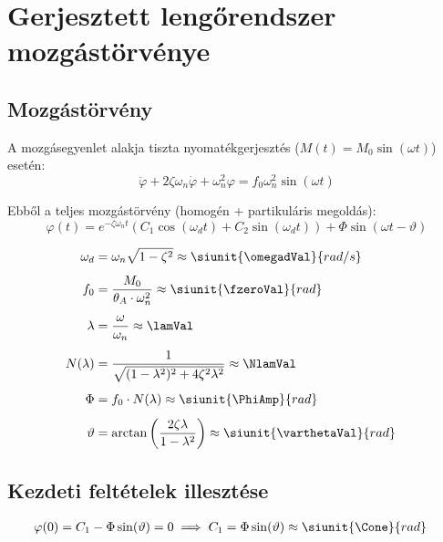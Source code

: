 \section{Gerjesztett lengőrendszer mozgástörvénye}

\subsection{Mozgástörvény}
A mozgásegyenlet alakja tiszta nyomatékgerjesztés ($M(t) = M_0 \sin(\omega t)$) esetén:
\begin{equation}
    \ddot{\varphi} + 2\zeta\omega_n\dot{\varphi} + \omega_n^2\varphi = f_0\omega_n^2 \sin(\omega t)
\end{equation}

Ebből a teljes mozgástörvény (homogén + partikuláris megoldás):
\begin{equation}
    \varphi(t) = e^{-\zeta\omega_n t} \left( C_1 \cos(\omega_d t) + C_2 \sin(\omega_d t) \right) + \Phi \sin(\omega t - \vartheta)
\end{equation}

\begin{align}
    \omega_d   & = \omega_n \sqrt{1 - \zeta^2} \approx \siunit{\omegadVal}{rad/s}                                 \\[1ex]
    f_0        & = \frac{M_0}{\theta_A \cdot \omega_n^2} \approx \siunit{\fzeroVal}{rad}                          \\[1ex]
    \lambda    & = \frac{\omega}{\omega_n} \approx \lamVal                                                        \\[1ex]
    N(\lambda) & = \frac{1}{\sqrt{(1-\lambda^2)^2 + 4\zeta^2\lambda^2}} \approx \NlamVal                          \\[1ex]
    \Phi       & = f_0 \cdot N(\lambda) \approx \siunit{\PhiAmp}{rad}                                             \\[1ex]
    \vartheta  & = \arctan\left(\frac{2\zeta\lambda}{1-\lambda^2}\right) \approx \siunit{\varthetaVal}{rad} \quad
\end{align}

\subsection{Kezdeti feltételek illesztése}
\begin{align}
    \varphi(0) & = C_1 - \Phi \sin(\vartheta) = 0 \implies C_1 = \Phi \sin(\vartheta) \approx \siunit{\Cone}{rad}
\end{align}

